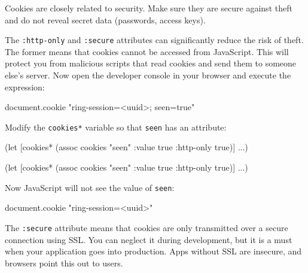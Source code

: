 
Cookies are closely related to security. Make sure they are secure against theft and do not reveal secret data (passwords, access keys).

The \verb|:http-only| and \verb|:secure| attributes can significantly reduce the risk of theft. The former means that cookies cannot be accessed from JavaScript. This will protect you from malicious scripts that read cookies and send them to someone else's server.  Now open the developer console in your browser and execute the expression:

\begin{english}
  \begin{js}
document.cookie
"ring-session=<uuid>; seen=true"
  \end{js}
\end{english}

\noindent Modify the \verb|cookies*| variable so that \verb|seen| has an attribute:

\ifx\DEVICETYPE\MOBILE

\begin{english}
  \begin{clojure}
(let [cookies*
      (assoc cookies "seen"
        {:value true
         :http-only true})]
  ...)
  \end{clojure}
\end{english}

\else

\begin{english}
  \begin{clojure}
(let [cookies* (assoc cookies "seen"
                      {:value true :http-only true})]
  ...)
  \end{clojure}
\end{english}

\fi

Now JavaScript will not see the value of \verb|seen|:

\begin{english}
  \begin{js}
document.cookie
"ring-session=<uuid>"
  \end{js}
\end{english}

The \verb|:secure| attribute means that cookies are only transmitted over a secure connection using SSL. You can neglect it during development, but it is a must when your application goes into production. Apps without SSL are insecure, and browsers point this out to users.

